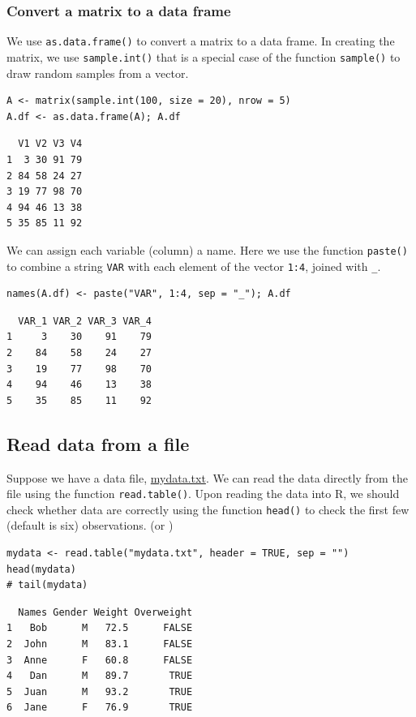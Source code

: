 \documentclass[a4paper,11pt]{article}
\begin{document}
\subsubsection*{Convert a matrix to a data frame}
\label{sec:orgfb89c11}

We use \texttt{as.data.frame()} to convert a matrix to a data frame. In
creating the matrix, we use \texttt{sample.int()} that is a special case of
the function \texttt{sample()} to draw random samples from a vector.
\begin{verbatim}
A <- matrix(sample.int(100, size = 20), nrow = 5)
A.df <- as.data.frame(A); A.df
\end{verbatim}

\begin{verbatim}
  V1 V2 V3 V4
1  3 30 91 79
2 84 58 24 27
3 19 77 98 70
4 94 46 13 38
5 35 85 11 92
\end{verbatim}

We can assign each variable (column) a name. Here we use the function
\texttt{paste()} to combine a string \texttt{VAR} with each element of the vector
\texttt{1:4}, joined with \texttt{\_}.
\begin{verbatim}
names(A.df) <- paste("VAR", 1:4, sep = "_"); A.df
\end{verbatim}

\begin{verbatim}
  VAR_1 VAR_2 VAR_3 VAR_4
1     3    30    91    79
2    84    58    24    27
3    19    77    98    70
4    94    46    13    38
5    35    85    11    92
\end{verbatim}


\subsection{Read data from a file}
\label{sec:org9e12098}

Suppose we have a data file, \url{mydata.txt}. We can read the data
directly from the file using the function \texttt{read.table()}. Upon reading
the data into R, we should check whether data are correctly using the
function \texttt{head()} to check the first few (default is six)
observations. (or )

\begin{verbatim}
mydata <- read.table("mydata.txt", header = TRUE, sep = "")
head(mydata)
# tail(mydata)
\end{verbatim}

\begin{verbatim}
  Names Gender Weight Overweight
1   Bob      M   72.5      FALSE
2  John      M   83.1      FALSE
3  Anne      F   60.8      FALSE
4   Dan      M   89.7       TRUE
5  Juan      M   93.2       TRUE
6  Jane      F   76.9       TRUE
\end{verbatim}
\end{document}
